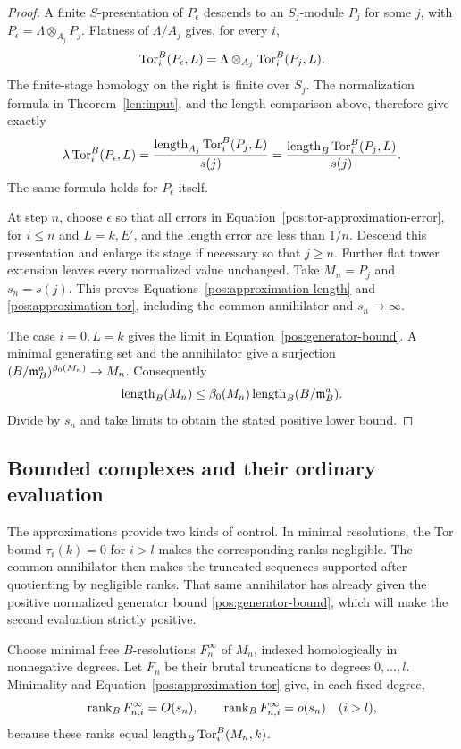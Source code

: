 \begin{proof}
A finite $S$-presentation of $P_\epsilon$ descends to an
$S_j$-module $P_j$ for some $j$, with
$P_\epsilon=\Lambda\otimes_{A_j}P_j$.  Flatness of
$\Lambda/A_j$ gives, for every $i$,
\[
 \operatorname{Tor}_i^B(P_\epsilon,L)
       =\Lambda\otimes_{A_j}\operatorname{Tor}_i^B(P_j,L).
\]
The finite-stage homology on the right is finite over $S_j$.
The normalization formula in Theorem~\ref{len:input}, and the
length comparison above, therefore give exactly
\[
 \lambda\operatorname{Tor}_i^B(P_\epsilon,L)
    =\frac{\operatorname{length}_{A_j}\operatorname{Tor}_i^B(P_j,L)}{s(j)}
    =\frac{\operatorname{length}_B\operatorname{Tor}_i^B(P_j,L)}{s(j)}.
\]
The same formula holds for $P_\epsilon$ itself.

At step $n$, choose $\epsilon$ so that all errors in
Equation~\eqref{pos:tor-approximation-error}, for $i\le n$ and
$L=k,E'$, and the length error are less than $1/n$.
Descend this presentation and enlarge its stage if necessary so
that $j\ge n$.  Further flat tower extension leaves every
normalized value unchanged.  Take $M_n=P_j$ and $s_n=s(j)$.
This proves Equations~\eqref{pos:approximation-length} and
\eqref{pos:approximation-tor}, including the common annihilator
and $s_n\to\infty$.

The case $i=0,L=k$ gives the limit in
Equation~\eqref{pos:generator-bound}.  A minimal generating set and the
annihilator give a surjection
$(B/\mathfrak{m}_B^a)^{\beta_0(M_n)}\to M_n$.  Consequently
\[
 \operatorname{length}_B(M_n)
    \le\beta_0(M_n)\operatorname{length}_B(B/\mathfrak{m}_B^a).
\]
Divide by $s_n$ and take limits to obtain the stated positive
lower bound.
\end{proof}

\subsection{Bounded complexes and their ordinary evaluation}

The approximations provide two kinds of control.  In minimal
resolutions, the Tor bound $\tau_i(k)=0$ for $i>l$ makes the
corresponding ranks negligible.  The common annihilator then makes
the truncated sequences
supported after quotienting by negligible ranks.  That same annihilator
has already given the positive normalized generator bound
\eqref{pos:generator-bound}, which will make the second evaluation
strictly positive.

Choose minimal free $B$-resolutions $F_n^\infty$ of $M_n$, indexed
homologically in nonnegative degrees.  Let $F_n$ be their brutal
truncations to degrees $0,\ldots,l$.  Minimality and
Equation~\eqref{pos:approximation-tor} give, in each fixed degree,
\begin{equation}\label{pos:rank-estimates}
 \operatorname{rank}_B F_{n,i}^\infty=O(s_n),\qquad
 \operatorname{rank}_B F_{n,i}^\infty=o(s_n)\quad(i>l),
\end{equation}
because these ranks equal $\operatorname{length}_B\operatorname{Tor}_i^B(M_n,k)$.

